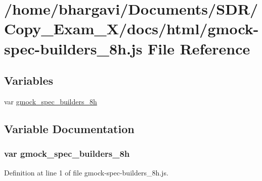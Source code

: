 \hypertarget{gmock-spec-builders__8h_8js}{}\section{/home/bhargavi/\+Documents/\+S\+D\+R/\+Copy\+\_\+\+Exam\+\_\+X/docs/html/gmock-\/spec-\/builders\+\_\+8h.js File Reference}
\label{gmock-spec-builders__8h_8js}
\subsection*{Variables}
\begin{DoxyCompactItemize}
\item 
var \hyperlink{gmock-spec-builders__8h_8js_a2960d0da38fddd46e643e7b5303a138f}{gmock\+\_\+spec\+\_\+builders\+\_\+8h}
\end{DoxyCompactItemize}


\subsection{Variable Documentation}
\subsubsection[{\texorpdfstring{gmock\+\_\+spec\+\_\+builders\+\_\+8h}{gmock_spec_builders_8h}}]{\setlength{\rightskip}{0pt plus 5cm}var gmock\+\_\+spec\+\_\+builders\+\_\+8h}\hypertarget{gmock-spec-builders__8h_8js_a2960d0da38fddd46e643e7b5303a138f}{}\label{gmock-spec-builders__8h_8js_a2960d0da38fddd46e643e7b5303a138f}


Definition at line 1 of file gmock-\/spec-\/builders\+\_\+8h.\+js.

